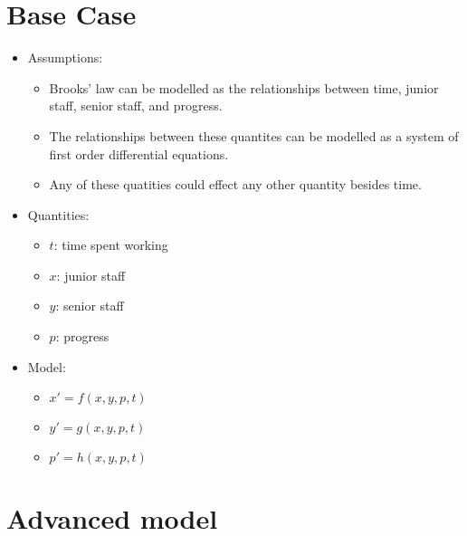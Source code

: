\documentclass{article}
\begin{document}
\section*{Base Case}
    \begin{itemize}
        \item Assumptions:
            \begin{itemize}
                \item Brooks' law can be modelled as the relationships between time, junior staff, senior staff, and progress.
                \item The relationships between these quantites can be modelled as a system of first order differential equations.
                \item Any of these quatities could effect any other quantity besides time.
            \end{itemize}
        \item Quantities:
            \begin{itemize}
                \item $t$: time spent working
                \item $x$: junior staff
                \item $y$: senior staff
                \item $p$: progress
            \end{itemize}
        \item Model:
            \begin{itemize}
                \item $x\prime = f\left(x, y, p, t\right)$
                \item $y\prime = g\left(x, y, p, t\right)$
                \item $p\prime = h\left(x, y, p, t\right)$
            \end{itemize}
    \end{itemize}

\section*{Advanced model}
\end{document}

